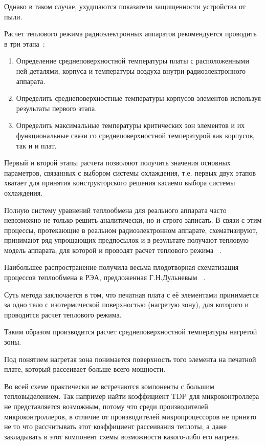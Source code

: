 Однако в таком случае, ухудшаются показатели защищенности устройства
от пыли.

Расчет теплового режима радиоэлектронных аппаратов рекомендуется
проводить в три этапа~\cite{Rotkop1976}:
\begin{enumerate}[label={\arabic*.}]
  \item Определение среднеповерхностной температуры платы с
расположенными ней деталями, корпуса и температуры воздуха внутри
радиоэлектронного аппарата.
  \item Определить среднеповерхностные температуры корпусов элементов
  используя результаты первого этапа.
  \item Определить максимальные температуры критических зон элементов и
их функциональные связи со среднеповерхностной температурой как
корпусов, так и и плат.
\end{enumerate}

Первый и второй этапы расчета позволяют получить значения основных
параметров, связанных с выбором системы охлаждения, т.е. первых двух
этапов хватает для принятия конструкторского решения касаемо выбора
системы охлаждения.

Полную систему уравнений теплообмена для реального аппарата часто
невозможно не только решить аналитически, но и строго записать. В
связи с этим процессы, протекающие в реальном радиоэлектронном
аппарате, схематизируют, принимают ряд упрощающих предпосылок и в
результате получают тепловую модель аппарата, для которой и проводят
расчет теплового режима ~\cite{Rotkop1976}.

Наибольшее распространение получила весьма плодотворная схематизация
процессов теплообмена в РЭА, предложенная Г.Н.Дульневым
~\cite{Dulnev1968}.

Суть метода заключается в том, что печатная плата с её элементами
принимается за одно тело с изотермической поверхностью (нагретую
зону), для которого и проводится расчет теплового режима.

Таким образом производится расчет среднеповерхностной температуры
нагретой зоны.

Под понятием нагретая зона понимается поверхность того элемента на
печатной плате, который рассеивает больше всего мощности.

Во всей схеме практически не встречаются компоненты с большим
тепловыделением. Так например найти коэффициент TDP для
микроконтроллера не представляется возможным, потому что среди
производителей микроконтроллеров, в отличие от производителей
микропроцессоров не принято не то что рассчитывать этот коэффициент
рассеивания теплоты, а даже закладывать в этот компонент схемы
возможности какого-либо его нагрева.

